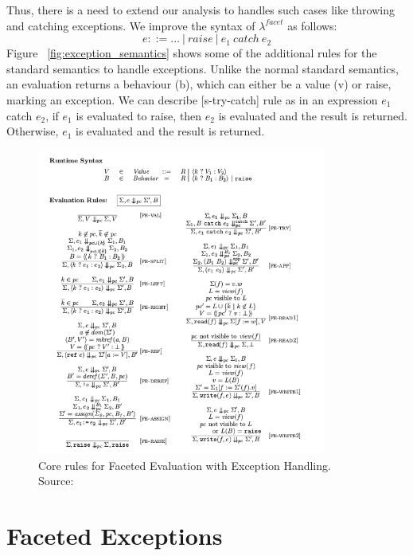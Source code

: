 Thus, there is a need to extend our analysis to handles such cases like throwing and catching exceptions. We improve the syntax of $\lambda^{facet}$ as follows:
$$
	e ::= ...\ |\ raise\ |\ e_{1}\ catch\ e_{2}
$$	
Figure ~\ref{fig:exception_semantics} shows some of the additional rules for the standard semantics to handle exceptions. Unlike the normal standard semantics, an evaluation returns a behaviour (b), which can either be a value (v) or raise, marking an exception. We can describe [s-try-catch] rule as in an expression $e_{1}$ catch $e_{2}$, if $e_{1}$ is evaluated to raise, then $e_{2}$ is evaluated and the result is returned. Otherwise, $e_{1}$ is evaluated and the result is returned.

\begin{figure}
\centering
\includegraphics[width=0.85\textwidth]{images/fig4.png}
\caption[Core rules for Faceted Evaluation with Exception Handling.]{Core rules for Faceted Evaluation with Exception Handling. \\Source: ~\cite{bib4}} 
\label{fig:core_FEEXH}
\end{figure}

\section{Faceted Exceptions}

